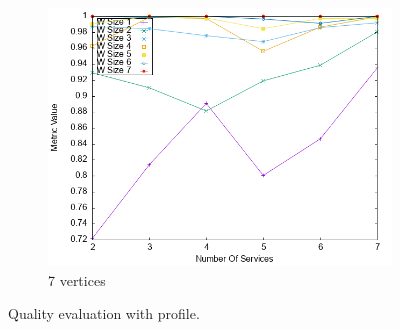 \begin{figure}[h]
\begin{subfigure}{0.33\textwidth}
    \includegraphics[width=\textwidth]{Images/graphs/newwindow_quality_performance_diff_perce_n7_s7_50_89_n7}
    \caption{7 vertices}
    \label{fig:quality_window_average_perce_7n}
  \end{subfigure}
  \caption{ Quality evaluation with \average profile.}
  \label{fig:quality_window_average_perce}
\end{figure}


